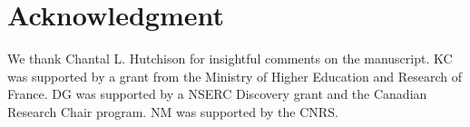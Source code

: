 \section{Acknowledgment}
We thank Chantal L. Hutchison for insightful comments on the manuscript.
KC was supported by a grant from the Ministry of Higher Education and Research of France. DG was supported by a NSERC Discovery grant and the Canadian Research Chair program. NM was supported by the CNRS.
